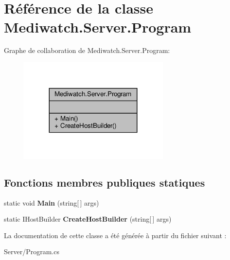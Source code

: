 \hypertarget{class_mediwatch_1_1_server_1_1_program}{}\section{Référence de la classe Mediwatch.\+Server.\+Program}
\label{class_mediwatch_1_1_server_1_1_program}


Graphe de collaboration de Mediwatch.\+Server.\+Program\+:\nopagebreak
\begin{figure}[H]
\begin{center}
\leavevmode
\includegraphics[width=215pt]{class_mediwatch_1_1_server_1_1_program__coll__graph}
\end{center}
\end{figure}
\subsection*{Fonctions membres publiques statiques}
\begin{DoxyCompactItemize}
\item 
\mbox{\label{class_mediwatch_1_1_server_1_1_program_a0b37e08654729aa1c9f3a572e5775305}} 
static void {\bfseries Main} (string\mbox{[}$\,$\mbox{]} args)
\item 
\mbox{\label{class_mediwatch_1_1_server_1_1_program_a5278302328dd5740238221820ef8fa07}} 
static I\+Host\+Builder {\bfseries Create\+Host\+Builder} (string\mbox{[}$\,$\mbox{]} args)
\end{DoxyCompactItemize}


La documentation de cette classe a été générée à partir du fichier suivant \+:\begin{DoxyCompactItemize}
\item 
Server/Program.\+cs\end{DoxyCompactItemize}
